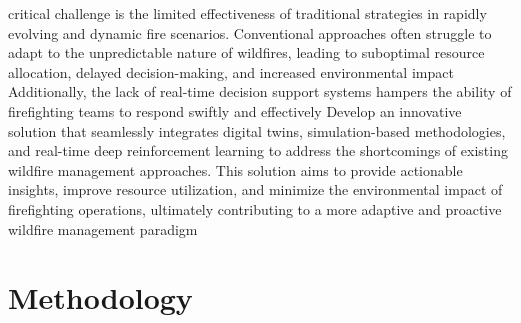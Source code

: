 \documentclass[lettersize,journal]{IEEEtran}
\begin{document}

critical challenge is the limited effectiveness of traditional strategies in rapidly evolving and dynamic fire scenarios. Conventional approaches often struggle to adapt to the unpredictable nature of wildfires, leading to suboptimal resource allocation, delayed decision-making, and increased environmental impact
Additionally, the lack of real-time decision support systems hampers the ability of firefighting teams to respond swiftly and effectively
Develop an innovative solution that seamlessly integrates digital twins, simulation-based methodologies, and real-time deep reinforcement learning to address the shortcomings of existing wildfire management approaches. This solution aims to provide actionable insights, improve resource utilization, and minimize the environmental impact of firefighting operations, ultimately contributing to a more adaptive and proactive wildfire management paradigm








\section{Methodology}\label{Methodology}



\end{document}
